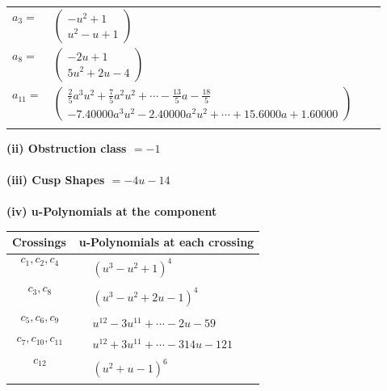 \documentclass[1p]{elsarticle_modified}
\theoremstyle{definition}
\begin{document}
\begin{tabular}{m{7pt} m{180pt} m{7pt} m{180pt} }
\flushright $a_{3}=$&$\begin{pmatrix}- u^2+1\\u^2- u+1\end{pmatrix}$ \\
\flushright $a_{8}=$&$\begin{pmatrix}-2 u+1\\5 u^2+2 u-4\end{pmatrix}$ \\
\flushright $a_{11}=$&$\begin{pmatrix}\frac{2}{5} a^3 u^2+\frac{7}{5} a^2 u^2+\cdots-\frac{13}{5} a-\frac{18}{5}\\-7.40000 a^{3} u^{2}-2.40000 a^{2} u^{2}+\cdots+15.6000 a+1.60000\end{pmatrix}$\\&\end{tabular}
\flushleft \textbf{(ii) Obstruction class $= -1$}\\~\\
\flushleft \textbf{(iii) Cusp Shapes $= -4 u-14$}\\~\\
\newpage\renewcommand{\arraystretch}{1}
\flushleft \textbf{(iv) u-Polynomials at the component}\newline \\
\begin{tabular}{m{50pt}|m{274pt}}
Crossings & \hspace{64pt}u-Polynomials at each crossing \\
\hline $$\begin{aligned}c_{1},c_{2},c_{4}\end{aligned}$$&$\begin{aligned}
&(u^3- u^2+1)^4
\end{aligned}$\\
\hline $$\begin{aligned}c_{3},c_{8}\end{aligned}$$&$\begin{aligned}
&(u^3- u^2+2 u-1)^4
\end{aligned}$\\
\hline $$\begin{aligned}c_{5},c_{6},c_{9}\end{aligned}$$&$\begin{aligned}
&u^{12}-3 u^{11}+\cdots-2 u-59
\end{aligned}$\\
\hline $$\begin{aligned}c_{7},c_{10},c_{11}\end{aligned}$$&$\begin{aligned}
&u^{12}+3 u^{11}+\cdots-314 u-121
\end{aligned}$\\
\hline $$\begin{aligned}c_{12}\end{aligned}$$&$\begin{aligned}
&(u^2+u-1)^6
\end{aligned}$\\
\hline
\end{tabular}\\~\\
\end{document}
